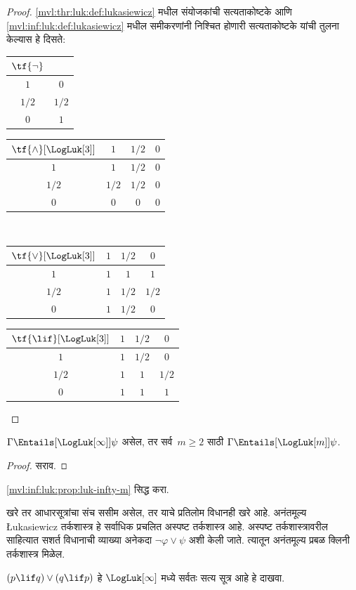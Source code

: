 \begin{proof}
  \ref{mvl:thr:luk:def:lukasiewicz} मधील संयोजकांची
  सत्यताकोष्टके आणि \ref{mvl:inf:luk:def:lukasiewicz} मधील
  समीकरणांनी निश्चित होणारी सत्यताकोष्टके यांची तुलना
  केल्यास हे दिसते:
  \begin{center}
    \begin{tabular}{c|c}
      $\tf{\lnot}$ & \\
      \hline
      $1$ & $0$ \\
      $1/2$ & $1/2$ \\
      $0$ & $1$
    \end{tabular}
    \quad
    \begin{tabular}{c|ccc}
      $\tf{\land}[\LogLuk[3]]$ & $1$ & $1/2$ & $0$ \\
      \hline
      $1$ & $1$ & $1/2$ & $0$ \\
      $1/2$ & $1/2$ & $1/2$ & $0$\\
      $0$ & $0$ & $0$ & $0$
    \end{tabular}
    \\[2ex]
    \begin{tabular}{c|ccc}
      $\tf{\lor}[\LogLuk[3]]$ & $1$ & $1/2$ & $0$ \\
      \hline
      $1$ & $1$ & $1$ & $1$ \\
      $1/2$ & $1$ & $1/2$ & $1/2$ \\
      $0$ & $1$ & $1/2$ & $0$
    \end{tabular}
    \quad
    \begin{tabular}{c|ccc}
      $\tf{\lif}[\LogLuk[3]]$ & $1$ & $1/2$ & $0$ \\
      \hline
      $1$ & $1$ & $1/2$ & $0$ \\
      $1/2$ & $1$ & $1$ & $1/2$  \\
      $0$ & $1$ & $1$ & $1$
    \end{tabular}
  \end{center}
\end{proof}
\begin{prop}\label{mvl:inf:luk:prop:luk-infty-m}
  $\Gamma \Entails[\LogLuk[\infty]] \psi$ असेल, तर
  सर्व~$m \ge 2$ साठी $\Gamma \Entails[\LogLuk[m]] \psi$.
\end{prop}
\begin{proof}
  सराव.
\end{proof}
\begin{prob}
  \ref{mvl:inf:luk:prop:luk-infty-m} सिद्ध करा.
\end{prob}
खरे तर आधारसूत्रांचा संच ससीम असेल, तर याचे प्रतिलोम
विधानही खरे आहे.
अनंतमूल्य \L ukasiewicz तर्कशास्त्र हे सर्वाधिक प्रचलित
अस्पष्ट तर्कशास्त्र आहे. अस्पष्ट तर्कशास्त्रावरील साहित्यात
सशर्त विधानाची व्याख्या अनेकदा $\lnot \varphi \lor \psi$ अशी
केली जाते. त्यातून अनंतमूल्य प्रबळ क्लिनी तर्कशास्त्र मिळेल.
\begin{prob}
  $(p \lif q) \lor (q \lif p)$ हे $\LogLuk[\infty]$
  मध्ये सर्वतः सत्य सूत्र आहे हे दाखवा.
\end{prob}

